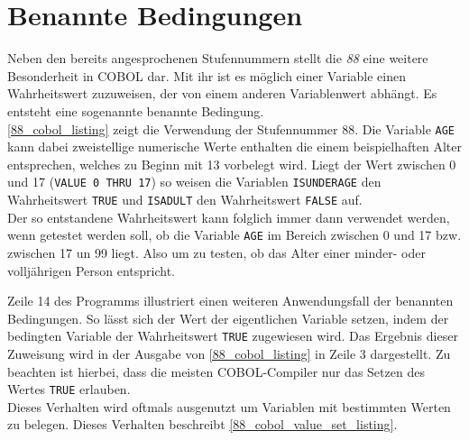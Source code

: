 \section{Benannte Bedingungen}
Neben den bereits angesprochenen Stufennummern stellt die \textit{88} eine weitere Besonderheit in COBOL dar. Mit ihr ist es möglich einer Variable einen Wahrheitswert zuzuweisen, der von einem anderen Variablenwert abhängt. Es entsteht eine sogenannte benannte Bedingung.\\

\autoref{88_cobol_listing} zeigt die Verwendung der Stufennummer 88. Die Variable \texttt{AGE} kann dabei zweistellige numerische Werte enthalten die einem beispielhaften Alter entsprechen, welches zu Beginn mit 13 vorbelegt wird. Liegt der Wert zwischen 0 und 17 (\texttt{VALUE 0 THRU 17}) so weisen die Variablen \texttt{ISUNDERAGE} den Wahrheitswert \texttt{TRUE} und \texttt{ISADULT} den Wahrheitswert \texttt{FALSE} auf.\\

Der so entstandene Wahrheitswert kann folglich immer dann verwendet werden, wenn getestet werden soll, ob die Variable \texttt{AGE} im Bereich zwischen 0 und 17 bzw. zwischen 17 un 99 liegt. Also um zu testen, ob das Alter einer minder- oder volljährigen Person entspricht.\\

\sepCodeAndOutputCheck
{}

Zeile 14 des Programms illustriert einen weiteren Anwendungsfall der benannten Bedingungen. So lässt sich der Wert der eigentlichen Variable setzen, indem der bedingten Variable der Wahrheitswert \texttt{TRUE} zugewiesen wird. Das Ergebnis dieser Zuweisung wird in der Ausgabe von \autoref{88_cobol_listing} in Zeile 3 dargestellt. Zu beachten ist hierbei, dass die meisten COBOL-Compiler nur das Setzen des Wertes \texttt{TRUE} erlauben.\\

Dieses Verhalten wird oftmals ausgenutzt um Variablen mit bestimmten Werten zu belegen. Dieses Verhalten beschreibt \autoref{88_cobol_value_set_listing}.\\

